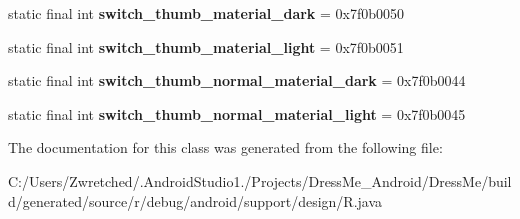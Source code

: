 \begin{DoxyCompactItemize}
\item 
\hypertarget{classandroid_1_1support_1_1design_1_1_r_1_1color_aa747920ff464421ba1f1f9c3f78bf414}{}static final int {\bfseries switch\+\_\+thumb\+\_\+material\+\_\+dark} = 0x7f0b0050\label{classandroid_1_1support_1_1design_1_1_r_1_1color_aa747920ff464421ba1f1f9c3f78bf414}

\item 
\hypertarget{classandroid_1_1support_1_1design_1_1_r_1_1color_a390bb266a32710d89c28dd338a73ef9a}{}static final int {\bfseries switch\+\_\+thumb\+\_\+material\+\_\+light} = 0x7f0b0051\label{classandroid_1_1support_1_1design_1_1_r_1_1color_a390bb266a32710d89c28dd338a73ef9a}

\item 
\hypertarget{classandroid_1_1support_1_1design_1_1_r_1_1color_a04cf39f37dbd30293bcf3e7aff284f44}{}static final int {\bfseries switch\+\_\+thumb\+\_\+normal\+\_\+material\+\_\+dark} = 0x7f0b0044\label{classandroid_1_1support_1_1design_1_1_r_1_1color_a04cf39f37dbd30293bcf3e7aff284f44}

\item 
\hypertarget{classandroid_1_1support_1_1design_1_1_r_1_1color_a1606fecd5761dcad3b76d802f1eb2509}{}static final int {\bfseries switch\+\_\+thumb\+\_\+normal\+\_\+material\+\_\+light} = 0x7f0b0045\label{classandroid_1_1support_1_1design_1_1_r_1_1color_a1606fecd5761dcad3b76d802f1eb2509}

\end{DoxyCompactItemize}


The documentation for this class was generated from the following file\+:\begin{DoxyCompactItemize}
\item 
C\+:/\+Users/\+Zwretched/.\+Android\+Studio1./\+Projects/\+Dress\+Me\+\_\+\+Android/\+Dress\+Me/build/generated/source/r/debug/android/support/design/R.\+java\end{DoxyCompactItemize}
